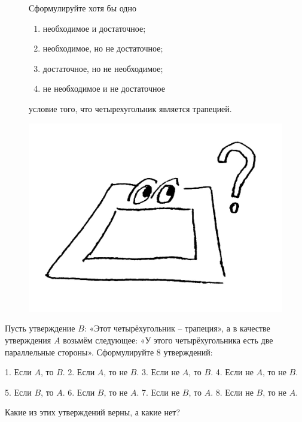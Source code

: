 \begin{figure}[H]
\begin{minipage}{0.79\linewidth}\setlength{\parindent}{1.5em}
    \begin{thm}
    Сформулируйте хотя бы одно
        \begin{enumerate}[label=\asbuk*), ref=\asbuk*]
        \item необходимое и достаточное;
        \item необходимое, но не достаточное;
        \item достаточное, но не необходимое;
        \item не необходимое и не достаточное
        \end{enumerate}
    условие того, что четырехугольник является трапецией.
    \end{thm}
\end{minipage}
\hfill
\begin{minipage}{0.2\linewidth}
    \includegraphics[width=0.95\columnwidth]{img/7.0 4 figura.jpg}
\end{minipage}
\end{figure} 

\begin{thm} \label{8.1 thm1}
    Пусть утверждение $B$: «Этот четырёхугольник – трапеция», а в качестве утверждения $A$ возьмём следующее: «У этого четырёхугольника есть две параллельные стороны». Сформулируйте 8 утверждений:
    \par
    1. Если $A$, то $B$. \hfill 2. Если $A$, то не $B$. \hfill 3. Если не $A$, то $B$. \hfill 4. Если не $A$, то не $B$.
    \par
    5. Если $B$, то $A$. \hfill 6. Если $B$, то не $A$. \hfill 7. Если не $B$, то $A$. \hfill 8. Если не $B$, то не $A$.
    \par
    Какие из этих утверждений верны, а какие нет?
\end{thm}

